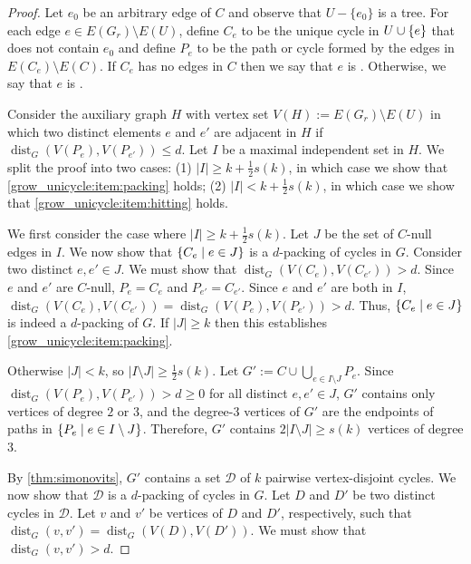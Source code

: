 \documentclass{patmorin}
\DeclareMathOperator{\dist}{dist}
\DeclarePairedDelimiter\set{\{}{\}}
\begin{document}
\begin{proof}
  Let $e_0$ be an arbitrary edge of $C$ and observe that $U-\{e_0\}$ is a tree.  For each edge $e\in E(G_{r})\setminus E(U)$,  define $C_e$ to be the unique cycle in $U\cup \set{e}$ 
  that does not contain $e_0$ and define $P_{e}$ to be the path or cycle formed by the edges in $E(C_{e})\setminus E(C)$.
  If $C_e$ has no edges in $C$ then we say that $e$ is .
  Otherwise, we say that $e$ is .
  
  Consider the auxiliary graph $H$ with vertex set $V(H):= E(G_{r})\setminus E(U)$ in which two distinct elements $e$ and $e'$ are adjacent in $H$ if $\dist_G(V(P_{e}),V(P_{e'})) \le d$.  Let $I$ be a maximal independent set in $H$. 
  We split the proof into two cases: 
  (1) $|I|\ge k+\frac{1}{2}s(k)$, in which case we show that \cref{grow_unicycle:item:packing} holds;
  (2) $|I|< k+\frac{1}{2}s(k)$, in which case we show that \cref{grow_unicycle:item:hitting} holds.
  
  We first consider the case where $|I|\ge k+\frac{1}{2}s(k)$.  Let $J$ be the set of $C$-null edges in $I$. 
  We now show that $\set{C_e \mid e\in J}$ is a $d$-packing of cycles in $G$.  Consider two distinct $e,e'\in J$.  We must show that $\dist_G(V(C_e),V(C_{e'}))>d$.
  Since $e$ and $e'$ are $C$-null, $P_e=C_e$ and $P_{e'}=C_{e'}$.
  Since $e$ and $e'$ are both in $I$, $\dist_G(V(C_e),V(C_{e'}))=\dist_G(V(P_e),V(P_{e'}))>d$. 
  Thus, $\set{C_e \mid e\in J}$ is indeed a $d$-packing of $G$.  If $|J|\ge k$ then this establishes \eqref{grow_unicycle:item:packing}.  

  Otherwise $|J|<k$, so $|I\setminus J|\ge \tfrac{1}{2}s(k)$.
  Let $G':=C\cup\bigcup_{e\in I\setminus J} P_e$.
  Since $\dist_G(V(P_e),V(P_{e'}))>d\ge0$ for all distinct $e,e'\in J$, $G'$ contains only vertices of degree $2$ or $3$, and the degree-$3$ vertices of $G'$ are the endpoints of paths in $\set{P_e \mid e\in I\setminus J}$.
  Therefore, $G'$ contains $2|I\setminus J|\geq s(k)$ vertices of degree $3$.
  
  By \cref{thm:simonovits}, $G'$ contains a set $\mathcal{D}$ of $k$ pairwise vertex-disjoint cycles.
  We now show that $\mathcal{D}$ is a $d$-packing of cycles in $G$.
  Let $D$ and $D'$ be two distinct cycles in $\mathcal{D}$.
  Let $v$ and $v'$ be vertices of $D$ and $D'$, respectively,
  such that $\dist_G(v,v')=\dist_G(V(D),V(D'))$.  We must show that $\dist_G(v,v')>d$.


\end{proof}
\end{document}
